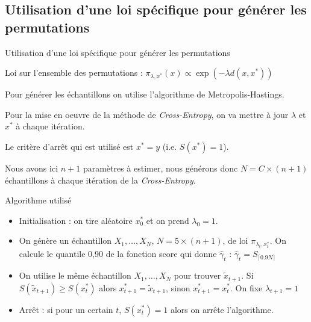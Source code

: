 \documentclass[10pt,xcolor=table,color={dvipsnames,usenames},ignorenonframetext,usepdftitle=false,french]{beamer}
\begin{document}
\subsection{Utilisation d'une loi spécifique pour générer les
permutations}\label{utilisation-dune-loi-spuxe9cifique-pour-guxe9nuxe9rer-les-permutations}

\begin{frame}{Utilisation d'une loi spécifique pour générer les
permutations}

Loi sur l'ensemble des permutations :
\(\pi_{\lambda,x^*}(x) \propto \exp{(-\lambda d(x,x^{*}))}\)

Pour générer les échantillons on utilise l'algorithme de
Metropolis-Hastings.

Pour la mise en oeuvre de la méthode de \emph{Cross-Entropy}, on va
mettre à jour \(\lambda\) et \(x^*\) à chaque itération.

Le critère d'arrêt qui est utilisé est \(x^*=y\) (i.e. \(S(x^*)=1\)).

Nous avons ici \(n+1\) paramètres à estimer, nous générons donc
\(N = C\times (n+1)\) échantillons à chaque itération de la
\emph{Cross-Entropy}.

\end{frame}

\begin{frame}{Algorithme utilisé}

\begin{itemize}
\item Initialisation : on tire aléatoire $x^*_0$ et on prend $\lambda_0=1$.
\item  On génère un échantillon $X_{1},\dots,X_{N}$, $N=5\times (n+1)$, de loi $\pi_{\lambda_t,x^*_t}$. On calcule le quantile 0,90 de la fonction score qui donne $\hat{\gamma}_{t}$ : $\hat{\gamma}_{t}=S_{\lceil0.9N\rceil}$
\item On utilise le même échantillon $X_{1},\dots,X_{N}$ pour trouver $\tilde x_{t+1}$. Si $S(\tilde x_{t+1})\geq S(x^*_t)$ alors $x^*_{t+1} = \tilde x_{t+1}$, sinon $x^*_{t+1}=x^*_{t}$. On fixe $\lambda_{t+1}=1$
\item Arrêt : si pour un certain $t$, $S(x^*_{t})=1$ alors on arrête l'algorithme.
\end{itemize}

\end{frame}
\end{document}
